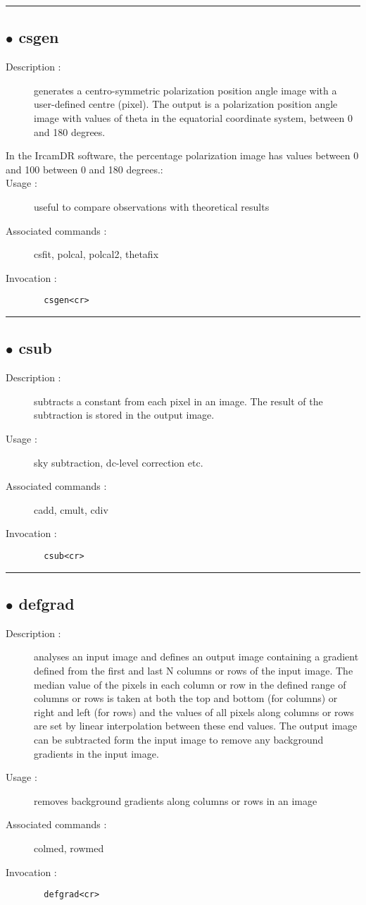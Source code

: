 \hrule \subsection*{$\bullet$ csgen}
\begin{description}
\item[Description :] generates a centro-symmetric polarization position angle image
with a user-defined centre (pixel).  The output is a polarization
position angle image with values of theta in the equatorial coordinate
system, between 0 and 180 degrees.
\item[In the IrcamDR software, the percentage polarization image has values
between 0 and 100%
between 0 and 180 degrees.:]
\item[Usage :] useful to compare observations with theoretical results
\item[Associated commands :] csfit, polcal, polcal2, thetafix
\item[Invocation :]

\verb+  csgen<cr> +\end{description}

\hrule \subsection*{$\bullet$ csub}
\begin{description}
\item[Description :] subtracts a constant from each pixel in an image.  The result of
the subtraction is stored in the output image.
\item[Usage :] sky subtraction, dc-level correction etc.
\item[Associated commands :] cadd, cmult, cdiv
\item[Invocation :]

\verb+  csub<cr> +\end{description}

\hrule \subsection*{$\bullet$ defgrad}
\begin{description}
\item[Description :] analyses an input image and defines an output image containing
a gradient defined from the first and last N columns or rows of the input
image.  The median value of the pixels in each column or row in the
defined range of columns or rows is taken at both the top and bottom (for
columns) or right and left (for rows) and the values of all pixels along
columns or rows are set by linear interpolation between these end values.
The output image can be subtracted form the input image to remove any
background gradients in the input image.
\item[Usage :] removes background gradients along columns or rows in an image
\item[Associated commands :] colmed, rowmed
\item[Invocation :]

\verb+  defgrad<cr> +\end{description}

